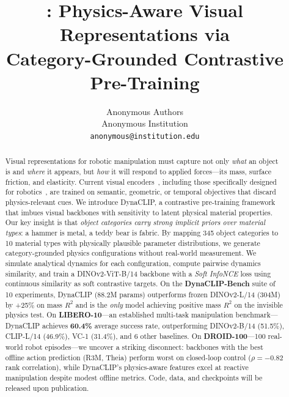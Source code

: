 \documentclass{article}
\title{\methodname{}: Physics-Aware Visual Representations via \\ Category-Grounded Contrastive Pre-Training}
\author{
  Anonymous Authors \\
  Anonymous Institution \\
  \texttt{anonymous@institution.edu}
}
\newcommand{\methodname}{DynaCLIP}
\newcommand{\best}[1]{\textbf{#1}}
\begin{document}
\maketitle

\begin{abstract}
Visual representations for robotic manipulation must capture not only \emph{what} an object is and \emph{where} it appears, but \emph{how} it will respond to applied forces---its mass, surface friction, and elasticity. Current visual encoders~\cite{oquab2024dinov2,radford2021clip,zhai2023siglip}, including those specifically designed for robotics~\cite{nair2022r3m,radosavovic2023vc1,karamcheti2023voltron}, are trained on semantic, geometric, or temporal objectives that discard physics-relevant cues. We introduce \methodname{}, a contrastive pre-training framework that imbues visual backbones with sensitivity to latent physical material properties. Our key insight is that \emph{object categories carry strong implicit priors over material types}: a hammer is metal, a teddy bear is fabric. By mapping 345 object categories to 10 material types with physically plausible parameter distributions, we generate category-grounded physics configurations without real-world measurement. We simulate analytical dynamics for each configuration, compute pairwise dynamics similarity, and train a DINOv2-ViT-B/14 backbone with a \emph{Soft InfoNCE} loss using continuous similarity as soft contrastive targets. On the \textbf{DynaCLIP-Bench} suite of 10 experiments, \methodname{} (88.2M params) outperforms frozen DINOv2-L/14 (304M) by +25\% on mass $R^2$ and is the \emph{only} model achieving positive mass $R^2$ on the invisible physics test. On \textbf{LIBERO-10}---an established multi-task manipulation benchmark---\methodname{} achieves \best{60.4\%} average success rate, outperforming DINOv2-B/14 (51.5\%), CLIP-L/14 (46.9\%), VC-1 (31.4\%), and 6 other baselines. On \textbf{DROID-100}---100 real-world robot episodes---we uncover a striking disconnect: backbones with the best offline action prediction (R3M, Theia) perform worst on closed-loop control ($\rho{=}-0.82$ rank correlation), while \methodname{}'s physics-aware features excel at reactive manipulation despite modest offline metrics. Code, data, and checkpoints will be released upon publication.
\end{abstract}

\end{document}
